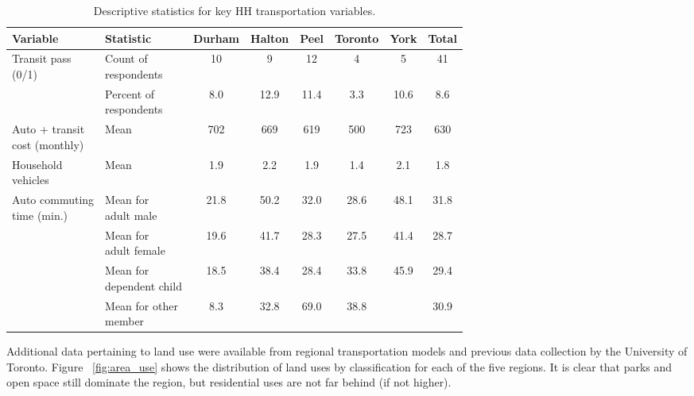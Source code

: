 \begin{table}[H]
\caption{Descriptive statistics for key HH transportation variables.}
  \label{tab:data_sum}
  \centering
\begin{tabular}{l l c c c c c c}
  \toprule
Variable & Statistic & Durham & Halton & Peel & Toronto & York & Total \\
\midrule
\makecell[l]{Transit pass\\(0/1)} & \makecell[l]{Count of\\respondents} & 10 & 9 & 12 & 4 & 5 & 41 \\
 & \makecell[l]{Percent of\\respondents} & 8.0 & 12.9 & 11.4 & 3.3 & 10.6 & 8.6 \\
\makecell[l]{Auto + transit\\cost (monthly)} & Mean & 702 & 669 & 619 & 500 & 723 & 630 \\
\makecell[l]{Household\\vehicles} & Mean & 1.9 & 2.2 & 1.9 & 1.4 & 2.1 & 1.8 \\
\makecell[l]{Auto commuting\\time (min.)} & \makecell[l]{Mean for\\adult male} & 21.8 & 50.2 & 32.0 & 28.6 & 48.1 & 31.8 \\
& \makecell[l]{Mean for\\adult female} & 19.6 & 41.7 & 28.3 & 27.5 & 41.4 & 28.7 \\
& \makecell[l]{Mean for\\dependent child} & 18.5 & 38.4 & 28.4 & 33.8 & 45.9 & 29.4 \\
& \makecell[l]{Mean for other\\member} & 8.3 & 32.8 & 69.0 & 38.8 & & 30.9 \\
\bottomrule
\end{tabular}
\end{table}

Additional data pertaining to land use were available from regional transportation models and previous data collection by the University of Toronto. Figure ~\ref{fig:area_use} shows the distribution of land uses by classification for each of the five regions. It is clear that parks and open space still dominate the region, but residential uses are not far behind (if not higher). 

